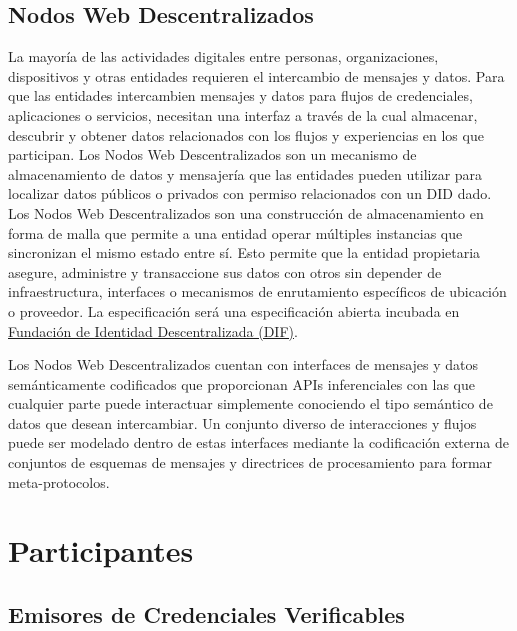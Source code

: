 \documentclass[11pt]{article}
\begin{document}
\vspace{1\baselineskip}
\subsection{Nodos Web Descentralizados}

\vspace{1\baselineskip}
La mayoría de las actividades digitales entre personas, organizaciones, dispositivos y otras entidades requieren el intercambio de mensajes y datos. Para que las entidades intercambien mensajes y datos para flujos de credenciales, aplicaciones o servicios, necesitan una interfaz a través de la cual almacenar, descubrir y obtener datos relacionados con los flujos y experiencias en los que participan. Los Nodos Web Descentralizados son un mecanismo de almacenamiento de datos y mensajería que las entidades pueden utilizar para localizar datos públicos o privados con permiso relacionados con un DID dado. Los Nodos Web Descentralizados son una construcción de almacenamiento en forma de malla que permite a una entidad operar múltiples instancias que sincronizan el mismo estado entre sí. Esto permite que la entidad propietaria asegure, administre y transaccione sus datos con otros sin depender de infraestructura, interfaces o mecanismos de enrutamiento específicos de ubicación o proveedor. La especificación será una especificación abierta incubada en \href{https://identity.foundation/decentralized-web-node/spec/}{\uline{\textcolor[HTML]{1155CC}{Fundación de Identidad Descentralizada (DIF)}}}.

\vspace{1\baselineskip}
Los Nodos Web Descentralizados cuentan con interfaces de mensajes y datos semánticamente codificados que proporcionan APIs inferenciales con las que cualquier parte puede interactuar simplemente conociendo el tipo semántico de datos que desean intercambiar. Un conjunto diverso de interacciones y flujos puede ser modelado dentro de estas interfaces mediante la codificación externa de conjuntos de esquemas de mensajes y directrices de procesamiento para formar meta-protocolos.

\section{Participantes}

\vspace{1\baselineskip}
\subsection{Emisores de Credenciales Verificables}
\end{document}
